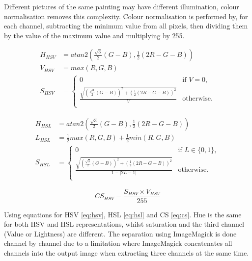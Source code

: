 \documentclass[11pt,a4paper,draft]{report}
\begin{document}
\begin{multicols}{2}
Different pictures of the same painting may have different illumination, colour
normalisation removes this complexity.  Colour normalisation is performed by,
for each channel, subtracting the minimum value from all pixels, then dividing
them by the value of the maximum value and multiplying by 255.

\begin{figure}[!htb]
\begin{equation}
\begin{aligned}
H_{HSV}  &= atan2\left(\frac{\sqrt{3}}{2}(G-B), \frac{1}{2}(2R-G-B)\right) \\
V_{HSV}  &= max(R,G,B) \\
S_{HSV}  &= \left\{
  \begin{array}{ll}
    0  &  \text{if } V = 0, \\
    \frac{\sqrt{ \left(\frac{\sqrt{3}}{2}(G-B)\right)^2
               + \left(\frac{1}{2}(2R-G-B)\right)^2 }}{V}
  &  \text{otherwise}. \\
  \end{array}
            \right.
\label{eq:hsv}
\end{aligned}
\end{equation}
\end{figure}

\begin{figure}[!htb]
\begin{equation}
\begin{aligned}
H_{HSL}  &= atan2\left(\frac{\sqrt{3}}{2}(G-B), \frac{1}{2}(2R-G-B)\right) \\
L_{HSL}  &= \frac{1}{2}max(R,G,B) + \frac{1}{2}min(R,G,B) \\
S_{HSL}  &= \left\{
  \begin{array}{ll}
    0  &  \text{if } L \in \{0,1\}, \\
    \frac{\sqrt{ \left(\frac{\sqrt{3}}{2}(G-B)\right)^2
               + \left(\frac{1}{2}(2R-G-B)\right)^2 }}{1 - \lvert 2L-1 \rvert}
  &  \text{otherwise}. \\
  \end{array}
           \right.
\label{eq:hsl}
\end{aligned}
\end{equation}
\end{figure}

\begin{equation}
CS_{HSV} = \frac{S_{HSV} \times V_{HSV}}{255}
\label{eq:cs}
\end{equation}

Using equations for HSV \ref{eq:hsv}, HSL \ref{eq:hsl} and CS \ref{eq:cs}.  Hue
is the same for both HSV and HSL representations, whilst saturation and the
third channel (Value or Lightness) are different.  The separation using
ImageMagick is done channel by channel due to a limitation where ImageMagick
concatenates all channels into the output image when extracting three channels
at the same time.


\end{multicols}
\end{document}
